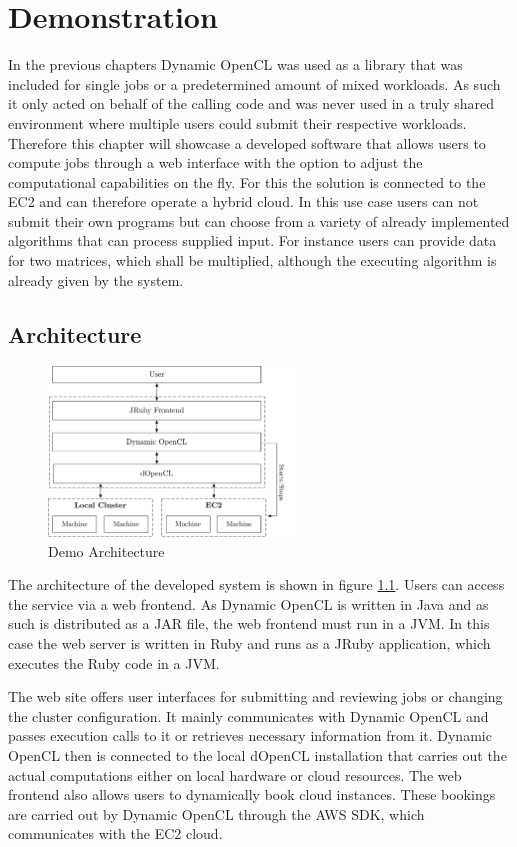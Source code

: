 \chapter{Demonstration}

In the previous chapters Dynamic OpenCL was used as a library that was included for single jobs or a predetermined amount of mixed workloads. As such it only acted on behalf of the calling code and was never used in a truly shared environment where multiple users could submit their respective workloads. Therefore this chapter will showcase a developed software that allows users to compute jobs through a web interface with the option to adjust the computational capabilities on the fly. For this the solution is connected to the EC2 and can therefore operate a hybrid cloud. In this use case users can not submit their own programs but can choose from a variety of already implemented algorithms that can process supplied input. For instance users can provide data for two matrices, which shall be multiplied, although the executing algorithm is already given by the system.

\section{Architecture}

\begin{figure}[!htb]
	\includegraphics[width=0.6\textwidth]{drawings/demo_architecture.pdf}
	\centering
	\caption{Demo Architecture}
	\label{img:demo_architecture}
\end{figure}
The architecture of the developed system is shown in figure \ref{img:demo_architecture}. Users can access the service via a web frontend. As Dynamic OpenCL is written in Java and as such is distributed as a JAR file, the web frontend must run in a JVM. In this case the web server is written in Ruby and runs as a JRuby application, which executes the Ruby code in a JVM. 

The web site offers user interfaces for submitting and reviewing jobs or changing the cluster configuration. It mainly communicates with Dynamic OpenCL and passes execution calls to it or retrieves necessary information from it. Dynamic OpenCL then is connected to the local dOpenCL installation that carries out the actual computations either on local hardware or cloud resources. The web frontend also allows users to dynamically book cloud instances. These bookings are carried out by Dynamic OpenCL through the AWS SDK, which communicates with the EC2 cloud.
